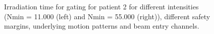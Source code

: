 \documentclass[type=dr, dr=rernat, accentcolor=tud7b,colorbacktitle, bigchapter, openright, twoside, 12pt ]{tudthesis}
\begin{document}

 \begin{figure}[H]
\caption{Irradiation time for gating for patient 2 for different intensities (Nmin = 11.000 (left) and Nmin = 55.000 (right)), different 
safety margins, underlying motion patterns and beam entry channels.}
\label{irrTime_gating_Pat024}
\end{figure}
\end{document}
